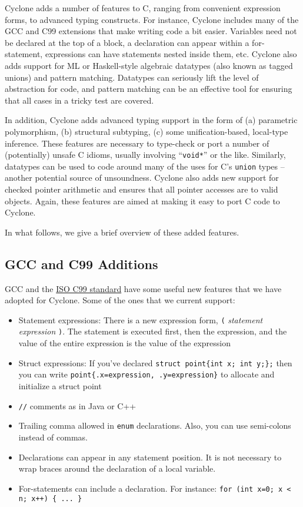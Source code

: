 Cyclone adds a number of features to C, ranging from convenient
expression forms, to advanced typing constructs.  For instance,
Cyclone includes many of the GCC and C99 extensions that make writing
code a bit easier.  Variables need not be declared at the top of a
block, a declaration can appear within a for-statement, expressions
can have statements nested inside them, etc.  Cyclone also adds
support for ML or Haskell-style algebraic datatypes (also known as
tagged unions) and pattern matching.  Datatypes can seriously lift the
level of abstraction for code, and pattern matching can be an
effective tool for ensuring that all cases in a tricky test are
covered.

In addition, Cyclone adds advanced typing support in the form of (a)
parametric polymorphism, (b) structural subtyping, (c) some
unification-based, local-type inference.  These features are necessary
to type-check or port a number of (potentially) unsafe C idioms,
usually involving ``\texttt{void*}'' or the like.  Similarly, datatypes
can be used to code around many of the uses for C's \texttt{union} types
-- another potential source of unsoundness.  Cyclone also adds new
support for checked pointer arithmetic and ensures that all pointer
accesses are to valid objects.  Again, these features are aimed at
making it easy to port C code to Cyclone.

In what follows, we give a brief overview of these added features.  

\subsection{GCC and C99 Additions}

GCC and the
\href{http://web.onetelnet.ch/~twolf/tw/c/c9x_changes.html}{ISO C99
  standard} have some useful new features that we have adopted for
Cyclone. Some of the ones that we current support:
\begin{itemize}
\item Statement expressions: There is a new expression form,
  \texttt{(\lb} \textit{statement} \textit{expression} \texttt{\rb)}.
  The statement is executed first, then the expression, and the value
  of the entire expression is the value of the expression
\item Struct expressions:  If you've declared
  \verb|struct point{int x; int y;};| then you can write
  \verb|point{.x=expression, .y=expression}| to allocate and
  initialize a struct point
\item \texttt{//} comments as in Java or C++
\item Trailing comma allowed in \texttt{enum} declarations.  Also, you
  can use semi-colons instead of commas.
\item Declarations can appear in any statement position.  It is not
  necessary to wrap braces around the declaration of a local variable.
\item For-statements can include a declaration. For instance:
  \verb|for (int x=0; x < n; x++) { ... }|
\end{itemize}


